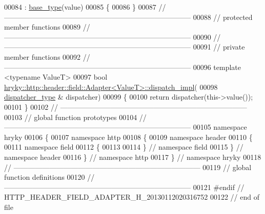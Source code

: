 \begin{DoxyCode}
00084     : \hyperlink{classhryky_1_1_adapter}{base_type}(value)
00085 \{
00086 \}
00087 \textcolor{comment}{//
      ------------------------------------------------------------------------------}
00088 \textcolor{comment}{// protected member functions}
00089 \textcolor{comment}{//
      ------------------------------------------------------------------------------}
00090 \textcolor{comment}{//
      ------------------------------------------------------------------------------}
00091 \textcolor{comment}{// private member functions}
00092 \textcolor{comment}{//
      ------------------------------------------------------------------------------}
00096 \textcolor{comment}{}\textcolor{keyword}{template} <\textcolor{keyword}{typename} ValueT>
00097 \textcolor{keywordtype}{bool} \hyperlink{classhryky_1_1http_1_1header_1_1field_1_1_adapter}{hryky::http::header::field::Adapter<ValueT>::dispatch_impl}(
00098     \hyperlink{classhryky_1_1http_1_1header_1_1field_1_1dispatcher_1_1_base}{dispatcher_type} & dispatcher)
00099 \{
00100     \textcolor{keywordflow}{return} dispatcher(this->value());
00101 \}
00102 \textcolor{comment}{//
      ------------------------------------------------------------------------------}
00103 \textcolor{comment}{// global function prototypes}
00104 \textcolor{comment}{//
      ------------------------------------------------------------------------------}
00105 \textcolor{keyword}{namespace }hryky
00106 \{
00107 \textcolor{keyword}{namespace }http
00108 \{
00109 \textcolor{keyword}{namespace }header
00110 \{
00111 \textcolor{keyword}{namespace }field
00112 \{
00113 
00114 \} \textcolor{comment}{// namespace field}
00115 \} \textcolor{comment}{// namespace header}
00116 \} \textcolor{comment}{// namespace http}
00117 \} \textcolor{comment}{// namespace hryky}
00118 \textcolor{comment}{//
      ------------------------------------------------------------------------------}
00119 \textcolor{comment}{// global function definitions}
00120 \textcolor{comment}{//
      ------------------------------------------------------------------------------}
00121 \textcolor{preprocessor}{#endif // HTTP\_HEADER\_FIELD\_ADAPTER\_H\_20130112020316752}
00122 \textcolor{preprocessor}{}\textcolor{comment}{// end of file}
\end{DoxyCode}

